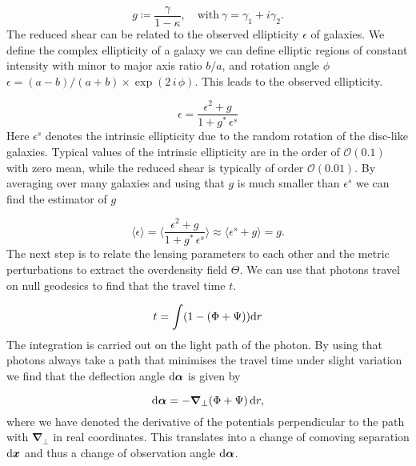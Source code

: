 \documentclass[../main.tex]{subfiles}
\begin{document}
\begin{equation}
    g \coloneqq \frac{\gamma}{1-\kappa},\quad \text{with}\: \gamma = \gamma_1 + i \gamma_2.
\end{equation} 
The reduced shear can be related to the observed ellipticity $\epsilon$ of galaxies. We define the complex ellipticity of a galaxy we can define elliptic regions of constant intensity with minor to major axis ratio $b/a$, and rotation angle $\phi$ $\epsilon=(a-b)/(a+b)\times \exp(2\,i\,\phi)$. This leads to the observed ellipticity.

\begin{equation}
    \epsilon = \frac{\epsilon^2+g}{1+g^*\,\epsilon^s}
\end{equation}
Here $\epsilon^s$ denotes the intrinsic ellipticity due to the random rotation of the disc-like galaxies. Typical values of the intrinsic ellipticity are in the order of $\mathcal{O}(0.1)$ with zero mean, while the reduced shear is typically of order $\mathcal{O}(0.01)$. By averaging over many galaxies and using that $g$ is much smaller than $\epsilon^s$ we can find the estimator of $g$ 

\begin{equation}
    \label{eq:lesning_estimator}
    \langle \epsilon \rangle=\langle \frac{\epsilon^2+g}{1+g^*\,\epsilon^s} \rangle \approx \langle \epsilon^s+g\rangle = g.
\end{equation}
The next step is to relate the lensing parameters to each other and the metric perturbations to extract the overdensity field $\varTheta$. We can use that photons travel on null geodesics to find that the travel time $t$.

\begin{equation*}
    t = \int (1-(\Phi+\Psi)) \mathrm{d} r
\end{equation*}
The integration is carried out on the light path of the photon. By using that photons always take a path that minimises the travel time under slight variation we find that the deflection angle $\mathrm{d} \boldsymbol{\alpha}$ is given by 

\begin{equation}
    \label{eq:deflectionangle}
    \mathrm{d} \boldsymbol{\alpha} = - \boldsymbol{\nabla}_\perp (\Phi+\Psi)\, \mathrm{d} r,
\end{equation}  
where we have denoted the derivative of the potentials perpendicular to the path with $\boldsymbol{\nabla}_\perp$ in real coordinates. This translates into a change of comoving separation $\mathrm{d} \boldsymbol{x}$ and thus a change of observation angle $\mathrm{d} \boldsymbol{\alpha}$.
\end{document}
